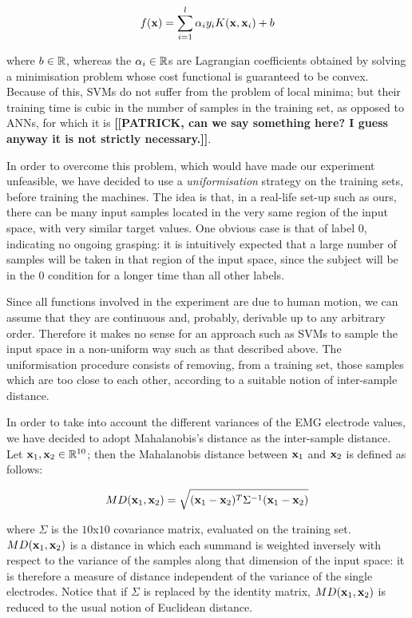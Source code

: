 \begin{equation} \label{eqn:sol}
  f(\xx) = \sum_{i=1}^l \alpha_i y_i K(\xx,\xx_i) + b
\end{equation}

\noindent where $b \in \mathbb{R}$, whereas the $\alpha_i \in \mathbb{R}$s are
Lagrangian coefficients obtained by solving a minimisation problem
whose cost functional is guaranteed to be convex. Because of this,
SVMs do not suffer from the problem of local minima; but their
training time is cubic in the number of samples in the training set,
as opposed to ANNs, for which it is \textbf{[[PATRICK, can we say
something here? I guess anyway it is not strictly necessary.]]}.

In order to overcome this problem, which would have made our
experiment unfeasible, we have decided to use a \emph{uniformisation}
strategy on the training sets, before training the machines. The idea
is that, in a real-life set-up such as ours, there can be many input
samples located in the very same region of the input space, with very
similar target values. One obvious case is that of label $0$,
indicating no ongoing grasping: it is intuitively expected that a
large number of samples will be taken in that region of the input
space, since the subject will be in the $0$ condition for a longer
time than all other labels.

Since all functions involved in the experiment are due to human
motion, we can assume that they are continuous and, probably,
derivable up to any arbitrary order. Therefore it makes no sense for
an approach such as SVMs to sample the input space in a non-uniform
way such as that described above. The uniformisation procedure
consists of removing, from a training set, those samples which are too
close to each other, according to a suitable notion of inter-sample
distance.

In order to take into account the different variances of the EMG
electrode values, we have decided to adopt Mahalanobis's distance as
the inter-sample distance. Let $\mathbf{x}_1, \mathbf{x}_2 \in \mathbb{R}^{10}$; then the
Mahalanobis distance between $\mathbf{x}_1$ and $\mathbf{x}_2$ is defined as
follows:

$$ MD(\mathbf{x}_1,\mathbf{x}_2) = \sqrt{(\mathbf{x}_1-\mathbf{x}_2)^T \Sigma^{-1} (\mathbf{x}_1-\mathbf{x}_2)} $$

\noindent where $\Sigma$ is the $10$x$10$ covariance matrix, evaluated
on the training set. $MD(\mathbf{x}_1,\mathbf{x}_2)$ is a distance in which each
summand is weighted inversely with respect to the variance of the
samples along that dimension of the input space: it is therefore a
measure of distance independent of the variance of the single
electrodes. Notice that if $\Sigma$ is replaced by the identity
matrix, $MD(\mathbf{x}_1,\mathbf{x}_2)$ is reduced to the usual notion of Euclidean
distance.

